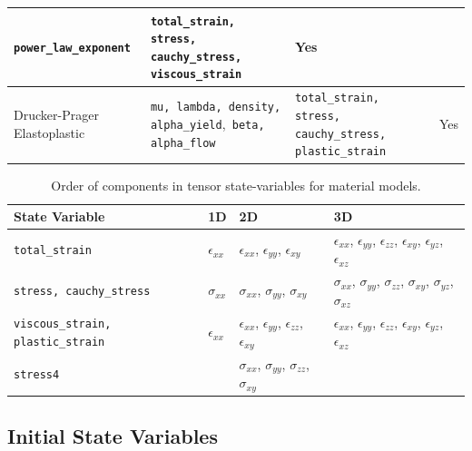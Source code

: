 \begin{center}
\begin{table}[H]
\begin{tabular}{|>{\centering}p{1.5in}|>{\centering}p{1.8in}|>{\centering}p{1.5in}|>{\centering}p{1in}|}
\texttt{power\_law\_exponent} & \texttt{total\_strain, stress, cauchy\_stress, viscous\_strain} & Yes\tabularnewline
\hline 
Drucker-Prager Elastoplastic & \texttt{mu, lambda, density, alpha\_yield},\texttt{ beta, alpha\_flow } & \texttt{total\_strain, stress, cauchy\_stress, plastic\_strain} & Yes\tabularnewline
\hline 
\end{tabular}
\end{table}
\begin{table}[H]
\centering{}\caption{\label{tab:material-model-statevars}Order of components in tensor
state-variables for material models.}
\begin{tabular}{|>{\centering}p{1.25in}|>{\centering}p{0.5in}|>{\centering}p{1.25in}|>{\centering}p{2.25in}|}
\hline 
\textbf{State Variable} & \textbf{1D} & \textbf{2D} & \textbf{3D}\tabularnewline
\hline 
\hline 
\texttt{total\_strain} & $\epsilon_{xx}$ & $\epsilon_{xx}$, $\epsilon_{yy}$, $\epsilon_{xy}$ & $\epsilon_{xx}$, $\epsilon_{yy}$, $\epsilon_{zz}$, $\epsilon_{xy}$,
$\epsilon_{yz}$, $\epsilon_{xz}$\tabularnewline
\hline 
\texttt{stress, cauchy\_stress} & $\sigma_{xx}$ & $\sigma_{xx}$, $\sigma_{yy}$, $\sigma_{xy}$ & $\sigma_{xx}$, $\sigma_{yy}$, $\sigma_{zz}$, $\sigma_{xy}$, $\sigma_{yz}$,
$\sigma_{xz}$\tabularnewline
\hline 
\texttt{viscous\_strain, plastic\_strain} & $\epsilon_{xx}$ & $\epsilon_{xx}$, $\epsilon_{yy}$, $\epsilon_{zz}$, $\epsilon_{xy}$ & $\epsilon_{xx}$, $\epsilon_{yy}$, $\epsilon_{zz}$, $\epsilon_{xy}$,
$\epsilon_{yz}$, $\epsilon_{xz}$\tabularnewline
\hline 
\texttt{stress4} &  & $\sigma_{xx}$, $\sigma_{yy}$, $\sigma_{zz}$, $\sigma_{xy}$ & \tabularnewline
\hline 
\end{tabular}
\end{table}

\par\end{center}


\subsection{\label{sec:Initial-State-Variables}Initial State Variables}

